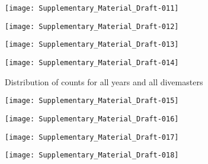 \documentclass[a4paper]{article}
\begin{document}

\begin{figure}[h!]
\texttt{[image: Supplementary\_Material\_Draft-011]}
\end{figure}




\begin{figure}[h!]
\texttt{[image: Supplementary\_Material\_Draft-012]}
\end{figure}




\begin{figure}[h!]
\texttt{[image: Supplementary\_Material\_Draft-013]}
\end{figure}


\begin{figure}[h!]
\texttt{[image: Supplementary\_Material\_Draft-014]}
\caption{Distribution of counts for all years and all divemasters}
\end{figure}


\begin{figure}[h!]
\texttt{[image: Supplementary\_Material\_Draft-015]}
\end{figure}	


\begin{figure}[h!]
\texttt{[image: Supplementary\_Material\_Draft-016]}
\end{figure}	


\begin{figure}[h!]
\texttt{[image: Supplementary\_Material\_Draft-017]}
\end{figure}	

\begin{figure}[h!]
\texttt{[image: Supplementary\_Material\_Draft-018]}
\end{figure}	
\end{document}
